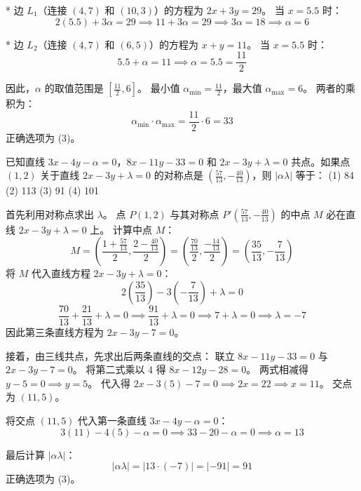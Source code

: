 \begin{questions}
\begin{solution}
* 边 $L_1$（连接 $(4, 7)$ 和 $(10, 3)$）的方程为 $2x + 3y = 29$。
  当 $x = 5.5$ 时：
  \[
  2(5.5) + 3\alpha = 29 \implies 11 + 3\alpha = 29 \implies 3\alpha = 18 \implies \alpha = 6
  \]

* 边 $L_2$（连接 $(4, 7)$ 和 $(6, 5)$）的方程为 $x + y = 11$。
  当 $x = 5.5$ 时：
  \[
  5.5 + \alpha = 11 \implies \alpha = 5.5 = \frac{11}{2}
  \]

因此，$\alpha$ 的取值范围是 $[\frac{11}{2}, 6]$。
最小值 $\alpha_{\min} = \frac{11}{2}$，最大值 $\alpha_{\max} = 6$。
两者的乘积为：
\[
\alpha_{\min} \cdot \alpha_{\max} = \frac{11}{2} \cdot 6 = 33
\]
正确选项为 (3)。
\end{solution}

\question
已知直线 $3x - 4y - \alpha = 0$，$8x - 11y - 33 = 0$ 和 $2x - 3y + \lambda = 0$ 共点。如果点 $(1, 2)$ 关于直线 $2x - 3y + \lambda = 0$ 的对称点是 $(\frac{57}{13}, -\frac{40}{13})$，则 $|\alpha\lambda|$ 等于：
(1) 84 \quad (2) 113 \quad (3) 91 \quad (4) 101

\begin{solution}
首先利用对称点求出 $\lambda$。
点 $P(1, 2)$ 与其对称点 $P'(\frac{57}{13}, -\frac{40}{13})$ 的中点 $M$ 必在直线 $2x - 3y + \lambda = 0$ 上。
计算中点 $M$：
\[
M = \left( \frac{1 + \frac{57}{13}}{2}, \frac{2 - \frac{40}{13}}{2} \right) = \left( \frac{\frac{70}{13}}{2}, \frac{-\frac{14}{13}}{2} \right) = \left( \frac{35}{13}, -\frac{7}{13} \right)
\]
将 $M$ 代入直线方程 $2x - 3y + \lambda = 0$：
\[
2\left(\frac{35}{13}\right) - 3\left(-\frac{7}{13}\right) + \lambda = 0
\]
\[
\frac{70}{13} + \frac{21}{13} + \lambda = 0 \implies \frac{91}{13} + \lambda = 0 \implies 7 + \lambda = 0 \implies \lambda = -7
\]
因此第三条直线方程为 $2x - 3y - 7 = 0$。

接着，由三线共点，先求出后两条直线的交点：
联立 $8x - 11y - 33 = 0$ 与 $2x - 3y - 7 = 0$。
将第二式乘以 4 得 $8x - 12y - 28 = 0$。
两式相减得 $y - 5 = 0 \implies y = 5$。
代入得 $2x - 3(5) - 7 = 0 \implies 2x = 22 \implies x = 11$。
交点为 $(11, 5)$。

将交点 $(11, 5)$ 代入第一条直线 $3x - 4y - \alpha = 0$：
\[
3(11) - 4(5) - \alpha = 0 \implies 33 - 20 - \alpha = 0 \implies \alpha = 13
\]

最后计算 $|\alpha\lambda|$：
\[
|\alpha\lambda| = |13 \cdot (-7)| = |-91| = 91
\]
正确选项为 (3)。
\end{solution}


\end{questions}
